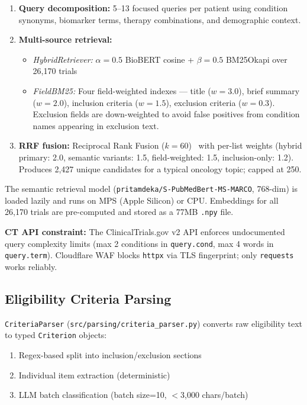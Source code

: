 \documentclass[10pt,twocolumn]{article}
\begin{document}
\begin{enumerate}[leftmargin=*, noitemsep, topsep=2pt]
  \item \textbf{Query decomposition:} 5--13 focused queries per patient using
    condition synonyms, biomarker terms, therapy combinations, and demographic context.
  \item \textbf{Multi-source retrieval:}
    \begin{itemize}[noitemsep, topsep=0pt]
      \item \textit{HybridRetriever:} $\alpha{=}0.5$ BioBERT cosine +
        $\beta{=}0.5$ BM25Okapi over 26,170 trials
      \item \textit{FieldBM25:} Four field-weighted indexes — title ($w{=}3.0$),
        brief summary ($w{=}2.0$), inclusion criteria ($w{=}1.5$), exclusion
        criteria ($w{=}0.3$). Exclusion fields are down-weighted to avoid false
        positives from condition names appearing in exclusion text.
    \end{itemize}
  \item \textbf{RRF fusion:} Reciprocal Rank Fusion ($k{=}60$)~\cite{cormack2009rrf}
    with per-list weights (hybrid primary: 2.0, semantic variants: 1.5,
    field-weighted: 1.5, inclusion-only: 1.2). Produces 2,427 unique candidates
    for a typical oncology topic; capped at 250.
\end{enumerate}

The semantic retrieval model (\texttt{pritamdeka/S-PubMedBert-MS-MARCO}, 768-dim)
is loaded lazily and runs on MPS (Apple Silicon) or CPU. Embeddings for all 26,170
trials are pre-computed and stored as a 77MB \texttt{.npy} file.

\textbf{CT API constraint:} The ClinicalTrials.gov v2 API enforces undocumented query
complexity limits (max 2 conditions in \texttt{query.cond}, max 4 words in
\texttt{query.term}). Cloudflare WAF blocks \texttt{httpx} via TLS fingerprint;
only \texttt{requests} works reliably.

\subsection{Eligibility Criteria Parsing}

\texttt{CriteriaParser} (\texttt{src/parsing/criteria\_parser.py}) converts raw
eligibility text to typed \texttt{Criterion} objects:

\begin{enumerate}[leftmargin=*, noitemsep, topsep=2pt]
  \item Regex-based split into inclusion/exclusion sections
  \item Individual item extraction (deterministic)
  \item LLM batch classification (batch size=10, $<$3,000 chars/batch)
\end{enumerate}
\end{document}
